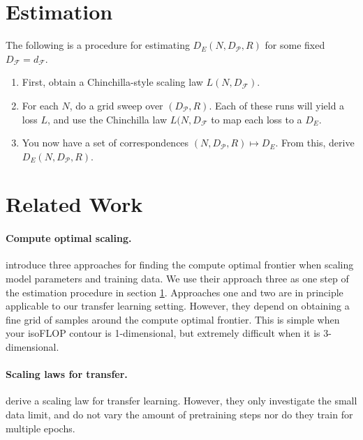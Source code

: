 \documentclass{article}
\begin{document}
    \section{Estimation}
    \label{estimation}
    The following is a procedure for estimating $D_E(N, D_{\mathcal{P}}, R)$ for some fixed $D_{\mathcal{F}}=d_{\mathcal{F}}$.
    \begin{enumerate}
        \item First, obtain a Chinchilla-style scaling law $L(N, D_{\mathcal{F}})$.
        \item For each $N$, do a grid sweep over $(D_{\mathcal{P}}, R)$. Each of these runs will yield a loss $L$, and use the  Chinchilla law $L(N, D_{\mathcal{F}}$ to map each loss to a $D_{E}$.
        \item You now have a set of correspondences $(N, D_{\mathcal{P}}, R) \mapsto D_{E}$. From this, derive $D_{E}\left(N, D_{\mathcal{P}}, R\right)$.
    \end{enumerate}
    \section{Related Work}
    \paragraph{Compute optimal scaling.} \cite{hoffmann2022training} introduce three approaches for finding the compute optimal frontier when scaling model parameters and training data. We use their approach three as one step of the estimation procedure in section \ref{estimation}. Approaches one and two are in principle applicable to our transfer learning setting. However, they depend on obtaining a fine grid of samples around the compute optimal frontier. This is simple when your isoFLOP contour is 1-dimensional, but extremely difficult when it is 3-dimensional.
    \paragraph{Scaling laws for transfer.} \cite{hernandez2021scaling} derive a scaling law for transfer learning. However, they only investigate the small data limit, and do not vary the amount of pretraining steps nor do they train for multiple epochs.

    
    
    
    

    
    

    
\end{document}
